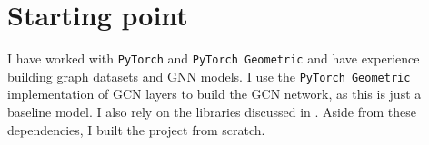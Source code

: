 
\section{Starting point}

I have worked with \texttt{PyTorch}\cite{paszke2019pytorch} and \texttt{PyTorch Geometric}\cite{Fey/Lenssen/2019} and have experience building graph datasets and GNN models.
I use the \texttt{PyTorch Geometric}\cite{Fey/Lenssen/2019} implementation of GCN layers to build the GCN network, as this is just a baseline model. I also rely on the libraries discussed in .
Aside from these dependencies, I built the project from scratch.

